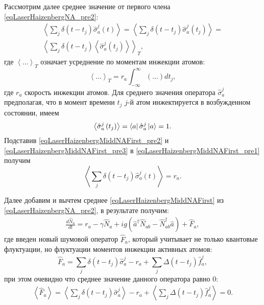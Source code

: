 Рассмотрим далее среднее значение от первого члена \eqref{eqLaserHaizenbergNA_pre2}:
\begin{eqnarray}
\left<\sum_j \delta\left(t -
t_j\right)\hat{\sigma}^{j}_{a}\left(t\right)\right> = 
\left<\sum_j \delta\left(t -
t_j\right)\hat{\sigma}^{j}_{a}\left(t_j\right)\right> =
\nonumber \\
\left<\sum_j \delta\left(t -
t_j\right)\left<\hat{\sigma}^{j}_{a}\left(t_j\right)\right>\right>_T,
\label{eqLaserHaizenbergMiddNAFirst_pre1}
\end{eqnarray}
где $\left<\dots\right>_T$ означает усреднение по моментам инжекции
атомов:
\begin{equation}
\left<\dots\right>_T =
r_a\int_{-\infty}^{\infty}\left(\dots\right)d t_j,
\label{eqLaserHaizenbergMiddNAFirst_pre2}
\end{equation}
где $r_a$ скорость инжекции атомов. 
Для среднего значения оператора $\hat{\sigma}^{j}_{a}$
предполагая, что в момент времени $t_j$ $j$-й атом инжектируется в
возбужденном состоянии, имеем
\begin{equation}
\left<\hat{\sigma}^{j}_{a}\left(t_j\right)\right> = 
\bra{a}\hat{\sigma}^{j}_{a}\ket{a} = 1.
\label{eqLaserHaizenbergMiddNAFirst_pre3}
\end{equation}  
Подставив \eqref{eqLaserHaizenbergMiddNAFirst_pre2} и
\eqref{eqLaserHaizenbergMiddNAFirst_pre3} в
\eqref{eqLaserHaizenbergMiddNAFirst_pre1} получим
\begin{equation}
\left<\sum_j \delta\left(t -
t_j\right)\hat{\sigma}^{j}_{a}\left(t\right)\right> = r_a.
\label{eqLaserHaizenbergMiddNAFirst}
\end{equation}

Далее добавим и вычтем среднее \eqref{eqLaserHaizenbergMiddNAFirst}
из \eqref{eqLaserHaizenbergNA_pre2}, в результате получим:
\begin{eqnarray}
\frac{d \hat{N}_{a}}{d t} 
= r_a  - \gamma
\hat{N}_{a} 
+ i g  \left(
\hat{a}^{\dag}\hat{N}_{ab} -
\hat{N}_{ab}^{\dag}\hat{a}
\right) + \hat{F}_{a},
\label{eqLaserHaizenbergNA}
\end{eqnarray}
где введен новый шумовой оператор $\hat{F}_{a}$, который учитывает не только
квантовые флуктуации, но флуктуации моментов инжекции активных атомов:
\begin{equation}
\hat{F}_{a} = \sum_j \delta\left(t - t_j\right)\hat{\sigma}^{j}_{a} -
r_a + \sum_j \Delta\left(t - t_j\right) \hat{f}_{a}^{j}, 
\label{eqLaserHaizenbergFNA}
\end{equation}
при этом очевидно что среднее значение данного оператора равно 0:
\begin{eqnarray}
\left<\hat{F}_{a}\right> = \left<\sum_j \delta\left(t - t_j\right)\hat{\sigma}^{j}_{a}\right> -
r_a + \left<\sum_j \Delta\left(t - t_j\right)
\hat{f}_{a}^{j}\right> = 0. 
\nonumber
\end{eqnarray}

